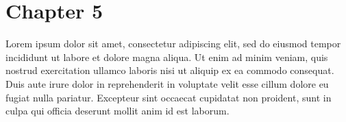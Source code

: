 \chapter{Chapter 5}
\par
Lorem ipsum dolor sit amet, consectetur adipiscing elit, sed do
eiusmod tempor incididunt ut labore et dolore magna aliqua. Ut
enim ad minim veniam, quis nostrud exercitation ullamco laboris
nisi ut aliquip ex ea commodo consequat. Duis aute irure dolor in
reprehenderit in voluptate velit esse cillum dolore eu fugiat
nulla pariatur. Excepteur sint occaecat cupidatat non proident,
sunt in culpa qui officia deserunt mollit anim id est laborum.
